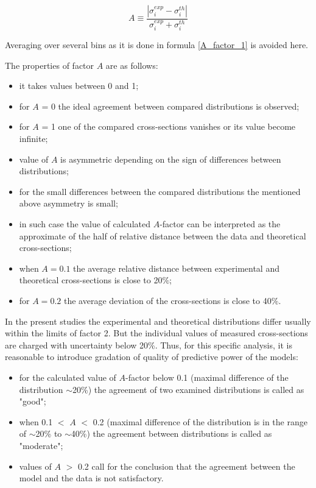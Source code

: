 \begin{equation}
\label{A_factor_2}
A \equiv  \frac{\left |\sigma^{exp}_{i} - \sigma^{th}_{i}\right
|}{\sigma^{exp}_{i} + \sigma^{th}_{i}}
\end{equation}

Averaging over several bins as it is
done in formula \ref{A_factor_1} is avoided here.

The properties of factor $A$ are as follows:
\begin{itemize}
    \item it takes values between 0 and 1;
    \item for $A$ = 0 the ideal agreement between compared distributions is observed;
    \item for $A$ = 1  one of the compared cross-sections vanishes or its value become infinite;
    \item value of $A$ is asymmetric depending on the sign of differences between distributions;
    \item for the small differences between the compared distributions the mentioned above asymmetry is small;
    \item in such case the value of calculated $A$-factor can be interpreted as the approximate of the half of relative distance between the data and theoretical cross-sections;
    \item when $A=0.1$ the average relative distance between experimental and theoretical cross-sections is close to 20$\%$;
    \item for $A=0.2$ the average deviation of the cross-sections is close to 40$\%$.
\end{itemize}

In the present studies the experimental and theoretical distributions differ usually within the limits of factor 2. But the individual values of measured cross-sections are charged with uncertainty below 20\%. Thus, for this specific analysis, it is reasonable to introduce gradation of quality of predictive power of the models:
\begin{itemize}
    \item for the calculated value of $A$-factor below 0.1 (maximal difference of the distribution $\sim$20\%) the agreement of two examined distributions is called as "good";
    \item when 0.1 $<$ $A$ $<$ 0.2 (maximal difference of the distribution is in the range of $\sim$20\% to $\sim$40\%) the agreement between distributions is called as "moderate";
    \item values of $A$ $>$ 0.2 call for the conclusion that the agreement between the model and the data is not satisfactory.
\end{itemize}

